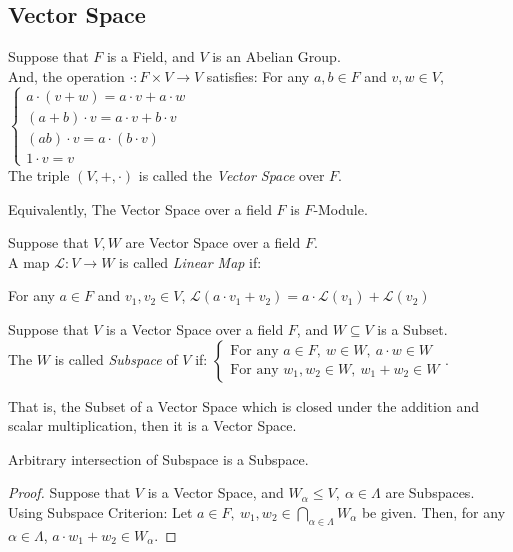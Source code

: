 \documentclass[11pt]{article}
\theoremstyle{romanstyle}
\begin{document}
\subsection{Vector Space}

\begin{definition}
    Suppose that $F$ is a Field, and $V$ is an Abelian Group. \\
    And, the operation $\cdot: F \times V \to V$ satisfies: For any $a, b \in F$ and $v, w \in V$,
    $\begin{cases}
        a \cdot (v + w) = a\cdot v + a\cdot w \\
        (a + b) \cdot v = a\cdot v + b\cdot v \\
        (ab) \cdot v = a \cdot (b \cdot v) \\
        1 \cdot v = v
    \end{cases}$ \\
    The triple $(V, +, \cdot)$ is called the \textit{Vector Space} over $F$.
\end{definition}
Equivalently, The Vector Space over a field $F$ is $F$-Module.
\begin{definition}
    Suppose that $V, W$ are Vector Space over a field $F$.\\
    A map $\mathcal{L}:V \to W$ is called \textit{Linear Map} if:
    \begin{center}
        For any $a \in F$ and $v_1, v_2 \in V$, $\mathcal{L}(a \cdot v_1 + v_2) = a \cdot \mathcal{L}(v_1) + \mathcal{L}(v_2)$
    \end{center}
\end{definition}
\begin{definition}
    Suppose that $V$ is a Vector Space over a field $F$, and $W \subseteq V$ is a Subset. \\
    The $W$ is called \textit{Subspace} of $V$ if:
    $\begin{cases}
        \text{For any $a \in F,\ w \in W,\ a \cdot w \in W$} \\
        \text{For any $w_1, w_2 \in W,\ w_1 + w_2 \in W$}
    \end{cases}$. \\
\end{definition}
That is, the Subset of a Vector Space which is closed under the addition and scalar multiplication, then it is a Vector Space.
\begin{lemma}
    Arbitrary intersection of Subspace is a Subspace.
\end{lemma}
\begin{proof}
    Suppose that $V$ is a Vector Space, and $W_\alpha \leq V,\ \alpha \in \Lambda$ are Subspaces. \\
    Using Subspace Criterion: Let $a \in F,\ w_1, w_2 \in \bigcap_{\alpha \in \Lambda} W_\alpha$ be given.
    Then, for any $\alpha \in \Lambda$, $a \cdot w_1 + w_2 \in W_\alpha$.
\end{proof}
\end{document}
